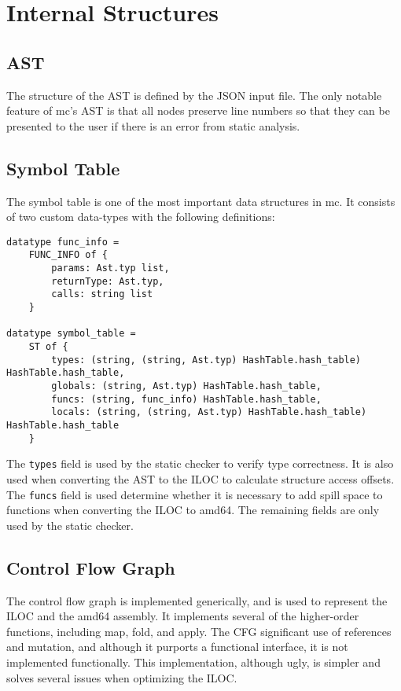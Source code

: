 \documentclass[12pt]{article}
\begin{document}
\section*{Internal Structures}
\subsection*{AST}
The structure of the AST is defined by the JSON input file. The only notable feature of mc's AST is that all nodes preserve line numbers so that they can be presented to the user if there is an error from static analysis.

\subsection*{Symbol Table}
The symbol table is one of the most important data structures in mc. It consists of two custom data-types with the following definitions:

\begin{Verbatim}[fontsize=\scriptsize]
datatype func_info =
    FUNC_INFO of {
        params: Ast.typ list,
        returnType: Ast.typ,
        calls: string list
    }

datatype symbol_table =
    ST of {
        types: (string, (string, Ast.typ) HashTable.hash_table) HashTable.hash_table,
        globals: (string, Ast.typ) HashTable.hash_table,
        funcs: (string, func_info) HashTable.hash_table,
        locals: (string, (string, Ast.typ) HashTable.hash_table) HashTable.hash_table
    }
\end{Verbatim}

The \texttt{types} field is used by the static checker to verify type correctness. It is also used when converting the AST to the ILOC to calculate structure access offsets. The \texttt{funcs} field is used determine whether it is necessary to add spill space to functions when converting the ILOC to amd64. The remaining fields are only used by the static checker.

\subsection*{Control Flow Graph}
The control flow graph is implemented generically, and is used to represent the ILOC and the amd64 assembly. It implements several of the higher-order functions, including map, fold, and apply. The CFG significant use of references and mutation, and although it purports a functional interface, it is not implemented functionally. This implementation, although ugly, is simpler and solves several issues when optimizing the ILOC.
\end{document}
